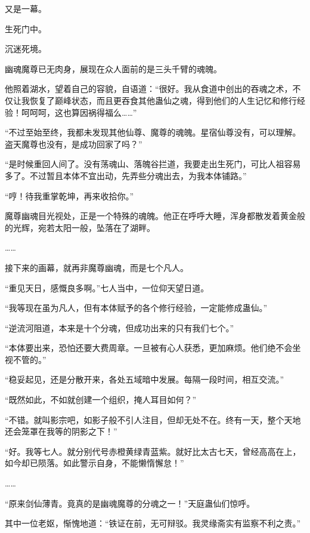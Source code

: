 
\begin{this_body}



又是一幕。

生死门中。

沉迷死境。

幽魂魔尊已无肉身，展现在众人面前的是三头千臂的魂魄。

他照着湖水，望着自己的容貌，自语道：“很好。我从食道中创出的吞魂之术，不仅让我恢复了巅峰状态，而且更吞食其他蛊仙之魂，得到他们的人生记忆和修行经验！呵呵呵，这也算因祸得福么……”

“不过至始至终，我都未发现其他仙尊、魔尊的魂魄。星宿仙尊没有，可以理解。盗天魔尊也没有，是成功回家了吗？”

“是时候重回人间了。没有荡魂山、落魄谷拦道，我要走出生死门，可比人祖容易多了。不过暂且本体不宜出动，先弄些分魂出去，为我本体铺路。”

“哼！待我重掌乾坤，再来收拾你。”

魔尊幽魂目光视处，正是一个特殊的魂魄。他正在呼呼大睡，浑身都散发着黄金般的光辉，宛若太阳一般，坠落在了湖畔。

……

接下来的画幕，就再非魔尊幽魂，而是七个凡人。

“重见天日，感慨良多啊。”七人当中，一位仰天望日道。

“我等现在虽为凡人，但有本体赋予的各个修行经验，一定能修成蛊仙。”

“逆流河阻道，本来是十个分魂，但成功出来的只有我们七个。”

“本体要出来，恐怕还要大费周章。一旦被有心人获悉，更加麻烦。他们绝不会坐视不管的。”

“稳妥起见，还是分散开来，各处五域暗中发展。每隔一段时间，相互交流。”

“既然如此，不如就创建一个组织，掩人耳目如何？”

“不错。就叫影宗吧，如影子般不引人注目，但却无处不在。终有一天，整个天地还会笼罩在我等的阴影之下！”

“好。我等七人。就分别代号赤橙黄绿青蓝紫。就好比太古七天，曾经高高在上，如今却已陨落。如此警示自身，不能懒惰懈怠！”

……

“原来剑仙薄青。竟真的是幽魂魔尊的分魂之一！”天庭蛊仙们惊呼。

其中一位老妪，惭愧地道：“铁证在前，无可辩驳。我灵缘斋实有监察不利之责。”


\end{this_body}
